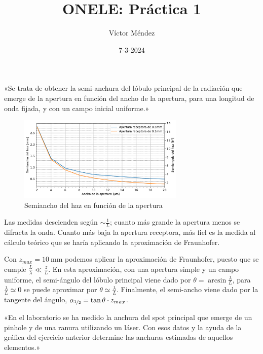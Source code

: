 \documentclass[spanish, a4paper, nobib]{tufte-handout}
\author{Víctor Méndez}
\title{ONELE: Práctica 1}
\date{7-3-2024}
\begin{document}
\maketitle


«Se trata de obtener la semi-anchura del lóbulo principal de la radiación que emerge de la apertura en función del ancho de la apertura, para una longitud de onda fijada, y con un campo inicial uniforme.»

\begin{figure}[h]
    \begin{center}
        \includegraphics[width=300px]{p1.pdf}
    \end{center}
    \caption{Semiancho del haz en función de la apertura}
    \label{fig:p1}
\end{figure}

Las medidas descienden según $\sim\frac{1}{L}$; cuanto más grande la apertura menos se difracta la onda. Cuanto más baja la apertura receptora, más fiel es la medida al cálculo teórico que se haría aplicando la aproximación de Fraunhofer.

Con $z_{max}=\qty{10}{\milli\meter}$ podemos aplicar la aproximación de Fraunhofer, puesto que se cumple $\frac{L}{\lambda}\ll\frac{z}{L}$. En esta aproximación, con una apertura simple y un campo uniforme, el semi-ángulo del lóbulo principal viene dado por $\theta=\arcsin{\frac{\lambda}{L}}$, para $\frac{\lambda}{L}\simeq 0$ se puede aproximar por $\theta\simeq\frac{\lambda}{L}$. Finalmente, el semi-ancho viene dado por la tangente del ángulo, $\alpha_{\nicefrac{1}{2}}=\tan{\theta}\cdot z_{max}$.


«En el laboratorio se ha medido la anchura del spot principal que emerge de un pinhole y de una ranura utilizando un láser. Con esos datos y la ayuda de la gráfica del ejercicio anterior determine las anchuras estimadas de aquellos elementos.»
\end{document}
